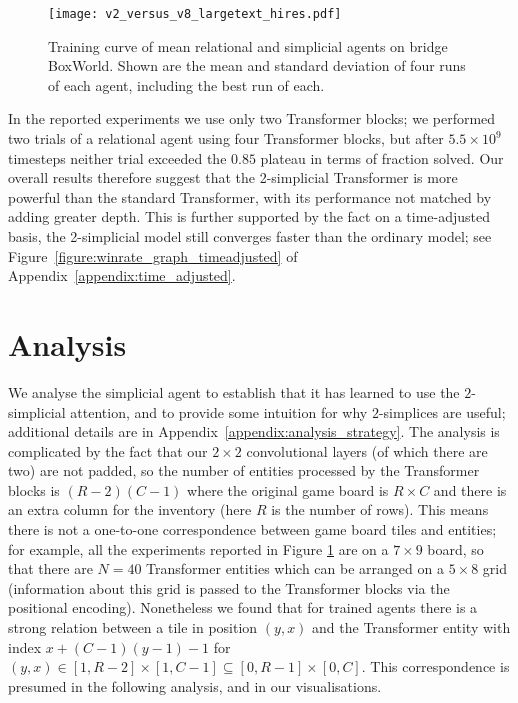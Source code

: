 \documentclass{article} %
\begin{document}
\begin{figure}[h]
\begin{center}
\texttt{[image: v2\_versus\_v8\_largetext\_hires.pdf]}
\end{center}
\caption{Training curve of mean relational and simplicial agents on bridge BoxWorld. Shown are the mean and standard deviation of four runs of each agent, including the best run of each.}
\label{figure:winrate_graph}
\end{figure}

In the reported experiments we use only two Transformer blocks; we performed two trials of a relational agent using four Transformer blocks, but after $5.5\times 10^9$ timesteps neither trial exceeded the $0.85$ plateau in terms of fraction solved. Our overall results therefore suggest that the 2-simplicial Transformer is more powerful than the standard Transformer, with its performance not matched by adding greater depth.  This is further supported by the fact on a time-adjusted basis, the 2-simplicial model still converges faster than the ordinary model; see Figure~\ref{figure:winrate_graph_timeadjusted} of Appendix~\ref{appendix:time_adjusted}.


\section{Analysis}
\label{section:analysis}

We analyse the simplicial agent to establish that it has learned to use the $2$-simplicial attention, and to provide some intuition for why $2$-simplices are useful; additional details are in Appendix~\ref{appendix:analysis_strategy}. The analysis is complicated by the fact that our $2 \times 2$ convolutional layers (of which there are two) are not padded, so the number of entities processed by the Transformer blocks is $(R-2)(C-1)$ where the original game board is $R \times C$ and there is an extra column for the inventory (here $R$ is the number of rows). This means there is not a one-to-one correspondence between game board tiles and entities; for example, all the experiments reported in Figure \ref{figure:winrate_graph} are on a $7\times9$ board, so that there are $N = 40$ Transformer entities which can be arranged on a $5\times 8$ grid (information about this grid is passed to the Transformer blocks via the positional encoding). Nonetheless we found that for trained agents there is a strong relation between a tile in position $(y,x)$ and the Transformer entity with index $x + (C-1)(y-1) - 1$ for $(y,x) \in [1,R-2]\times[1,C-1] \subseteq [0,R-1] \times [0,C]$. This correspondence is presumed in the following analysis, and in our visualisations.
\end{document}
